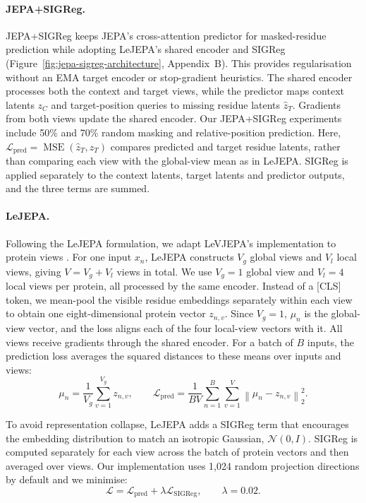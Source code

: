 \documentclass{article}
\begin{document}
\paragraph{JEPA+SIGReg.}
JEPA+SIGReg keeps JEPA's cross-attention predictor for masked-residue prediction while adopting LeJEPA's shared encoder and SIGReg (Figure~\ref{fig:jepa-sigreg-architecture}, Appendix~B). This provides regularisation without an EMA target encoder or stop-gradient heuristics. The shared encoder processes both the context and target views, while the predictor maps context latents $z_C$ and target-position queries to missing residue latents $\hat z_T$. Gradients from both views update the shared encoder.
Our JEPA+SIGReg experiments include 50\% and 70\% random masking and relative-position prediction.
Here, $\mathcal{L}_{\mathrm{pred}}=\operatorname{MSE}(\hat z_T,z_T)$ compares predicted and target residue latents, rather than comparing each view with the global-view mean as in LeJEPA. SIGReg is applied separately to the context latents, target latents and predictor outputs, and the three terms are summed.

\paragraph{LeJEPA.}
\label{sec:views}
Following the LeJEPA formulation, we adapt LeVJEPA's implementation to protein views \citep{kuhn2026levjepaefficientscalable}. 
For one input $x_n$, LeJEPA constructs $V_g$ global views and $V_l$ local views, giving $V=V_g+V_l$ views in total.
We use $V_g=1$ global view and $V_l=4$ local views per protein, all processed by the same encoder. Instead of a [CLS] token, we mean-pool the visible residue embeddings separately within each view to obtain one eight-dimensional protein vector $z_{n,v}$. Since $V_g=1$, $\mu_n$ is the global-view vector, and the loss aligns each of the four local-view vectors with it. All views receive gradients through the shared encoder. For a batch of $B$ inputs, the prediction loss averages the squared distances to these means over inputs and views:
\begin{equation}
\mu_n=\frac{1}{V_g}\sum_{v=1}^{V_g}z_{n,v},
\qquad
\mathcal{L}_{\mathrm{pred}}=\frac{1}{BV}\sum_{n=1}^{B}\sum_{v=1}^{V}
\left\|\mu_n-z_{n,v}\right\|_2^2.
\end{equation}

To avoid representation collapse, LeJEPA adds a SIGReg term that encourages the embedding distribution to match an isotropic Gaussian, $\mathcal{N}(0,I)$. 
SIGReg is computed separately for each view across the batch of protein vectors and then averaged over views. Our implementation uses 1,024 random projection directions by default and we minimise:
\begin{equation}
\mathcal{L}=\mathcal{L}_{\mathrm{pred}}+\lambda\mathcal{L}_{\mathrm{SIGReg}},
\qquad \lambda=0.02.
\end{equation}
\end{document}
